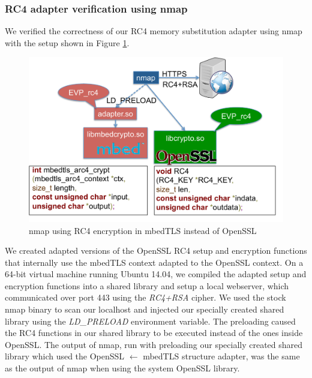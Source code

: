 \subsubsection{RC4 adapter verification using nmap} We verified the
correctness of our RC4 memory substitution adapter using nmap with the setup shown in Figure \ref{fig:nmap_struct_adapter}.
%
\begin{figure}[]
	\centering
	\caption{nmap using RC4 encryption in mbedTLS instead of OpenSSL}
	\label{fig:nmap_struct_adapter}
	\includegraphics[width=\widthfactor\columnwidth]{chapters/adapter_synthesis/figures/nmap_struct_adapter}
\end{figure}
%
We created adapted versions of the OpenSSL RC4 setup and encryption
functions that internally use the mbedTLS context adapted to the OpenSSL
context.
%
On a 64-bit virtual machine running Ubuntu 14.04, we compiled the adapted setup and encryption functions into a shared library and setup a local webserver, which communicated over port 443 using the \textit{RC4+RSA} cipher.
%
We used the stock nmap binary to scan our localhost and injected our specially created shared library using the \textit{LD\_PRELOAD} environment variable.
%
The preloading caused the RC4 functions in our shared library to be executed instead of the ones inside OpenSSL.
%
The output of nmap, run with preloading our specially created shared library which used the OpenSSL $\leftarrow$ mbedTLS structure adapter, was the same as the output of nmap when using the system OpenSSL library.
%
